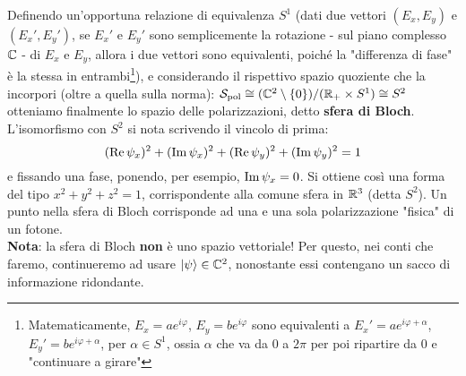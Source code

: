 \documentclass[FisicaTeorica.tex]{subfiles}
\begin{document}
Definendo un'opportuna relazione di equivalenza $S^1$ (dati due vettori $(E_x, E_y)$ e $(E_x', E_y')$, se $E_x'$ e $E_y'$ sono semplicemente la rotazione - sul piano complesso $\mathbb{C}$ - di $E_x$ e $E_y$, allora i due vettori sono equivalenti, poiché la "differenza di fase" è la stessa in entrambi\footnote{Matematicamente, $E_x = a e^{i\varphi}$, $E_y = b e^{i\varphi}$ sono equivalenti a $E_x' = a e^{i\varphi + \alpha}$, $E_y' = b e^{i\varphi + \alpha}$, per $\alpha \in S^1$, ossia $\alpha$ che va da $0$ a $2\pi$ per poi ripartire da $0$ e "continuare a girare"}), e considerando il rispettivo spazio quoziente che la incorpori (oltre a quella sulla norma): $\mathcal{S}_{\text{pol}} \cong (\mathbb{C}^2 \setminus \{0\})/(\mathbb{R}_+ \times S^1) \cong S^2$ otteniamo finalmente lo spazio delle polarizzazioni, detto \textbf{sfera di Bloch}.\\
L'isomorfismo con $S^2$ si nota scrivendo il vincolo di prima:
\[
(\operatorname{Re}\psi_x)^2 + (\operatorname{Im}\psi_x)^2 + (\operatorname{Re}\psi_y)^2 + (\operatorname{Im}\psi_y)^2 = 1
\]
e fissando una fase, ponendo, per esempio, $\operatorname{Im} \psi_x = 0$. Si ottiene così una forma del tipo $x^2 + y^2 + z^2 = 1$, corrispondente alla comune sfera in $\mathbb{R}^3$ (detta $S^2$).
Un punto nella sfera di Bloch corrisponde ad una e una sola polarizzazione "fisica" di un fotone.\\
\textbf{Nota}: la sfera di Bloch \textbf{non} è uno spazio vettoriale! Per questo, nei conti che faremo, continueremo ad usare $\ket{\psi} \in \mathbb{C}^2$, nonostante essi contengano un sacco di informazione ridondante.\\
\end{document}
